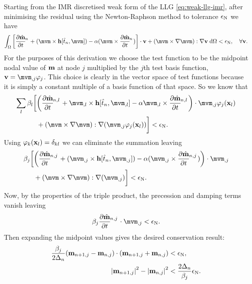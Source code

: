 Starting from the IMR discretised weak form of the LLG \cref{eq:weak-llg-imr}, after minimising the residual using \eg the Newton-Raphson method to tolerance $\epsilon_{\mathrm{N}}$ we have
\begin{equation}
  \intd{ \bigs{\dmdtm  + (\mvm \times \hv[\tm, \mvm]) - \dampc (\mvm \times \dmdtm)} \cdot \testv + \bigb{\mvm \times \grad \mvm} : \grad \testv} < \ntol, \quad \forall \testv.
\end{equation}
For the purposes of this derivation we choose the test function to be the midpoint nodal value of $\mathbf{m}$ at node $j$ multiplied by the $j$th test basis function, $\testv = \mvm_{,j} \tbf_j$.
This choice is clearly in the vector space of test functions because it is simply a constant multiple of a basis function of that space.
So we know that
\begin{equation}
  \begin{aligned}
    \sum_l \beta_l \bigg[& \bigb{\dmdtml + \mvm_{,l} \times \hv[\tm, \mvm_{,l}] - \dampc \mvm_{,l} \times \dmdtml} \cdot \mvm_{,j}\tbf_j(\xv_l) \\
      &+ \bigb{\mvm \times \grad \mvm} : \grad (\mvm_{,j}\tbf_j(\xv_l)) \bigg] < \ntol.
  \end{aligned}
\end{equation}
Using $\varphi_k(\mathbf{x}_l) = \delta_{kl}$ we can eliminate the summation leaving
\begin{equation}
  \begin{aligned}
    \beta_j \bigg[& \bigb{\dmdtmj  + (\mvm_{,j} \times \hv[\tm, \mvm_{,j}])  - \dampc (\mvm_{,j} \times \dmdtmj)} \cdot \mvm_{,j} \\
    &+ \bigb{\mvm \times \grad \mvm} : \grad (\mvm_{,j})
    \bigg] < \ntol.
  \end{aligned} 
\end{equation}
Now, by the properties of the triple product, the precession and damping terms vanish leaving
\begin{equation}
  \beta_j \dmdtmj \cdot  \mvm_{,j} < \ntol.
\end{equation}
Then expanding the midpoint values gives the desired conservation result:
\begin{equation}
  \begin{aligned}
    \frac{\beta_j}{2\Delta_{n}}(\mathbf{m}_{n+1,j} - \mathbf{m}_{n,j}) \cdot (\mathbf{m}_{n+1, j} + \mathbf{m}_{n, j}) &< \epsilon_{\mathrm{N}}, \\
    \left|{\mathbf{m}_{n+1, j}} \right|^2 - \left|{\mathbf{m}_{n, j}} \right|^2 &< \frac{2\Delta_{n}}{\beta_j} \epsilon_{\mathrm{N}}.
  \end{aligned}
\end{equation}

